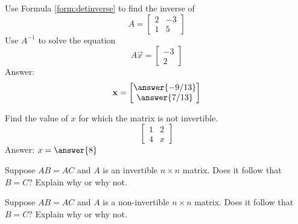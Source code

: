 \documentclass{ximera}
\begin{document}
\begin{problem}\label{prob:useformforinv}
Use Formula \ref{form:detinverse} to find the inverse of $$A=\begin{bmatrix}2&-3\\1&5\end{bmatrix}$$
Use $A^{-1}$ to solve the equation
$$A\vec{x}=\begin{bmatrix}-3\\2\end{bmatrix}$$
Answer:
$$\vec{x}=\begin{bmatrix}\answer{-9/13}\\\answer{7/13}\end{bmatrix}$$

\end{problem}

\begin{problem}\label{prob:notinv1}
Find the value of $x$ for which the matrix is not invertible. 
$$\begin{bmatrix}1&2\\4&x\end{bmatrix}$$
Answer: $x=\answer{8}$
\end{problem}



\begin{problem}\label{prob:cancelprop}
Suppose $AB=AC$ and $A$ is an invertible $n\times n$ matrix. Does it
follow that $B=C?$ Explain why or why not.
\end{problem}

\begin{problem}\label{prob:cancelpropsingular}
Suppose $AB=AC$ and $A$ is a non-invertible $n\times n$ matrix. Does it
follow that $B=C?$ Explain why or why not.
\end{problem}
\end{document}
